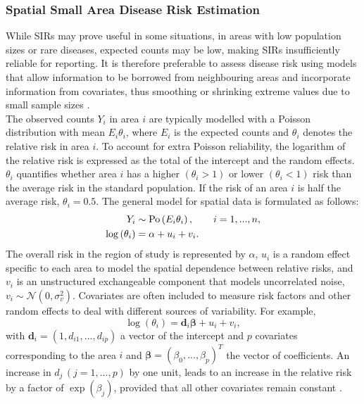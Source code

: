 \subsubsection{Spatial Small Area Disease Risk Estimation}\label{sec:spatial}
While SIRs may prove useful in some situations, in areas with low population sizes or rare diseases, expected counts may be low, making SIRs insufficiently reliable for reporting. It is therefore preferable to assess disease risk using models that allow information to be borrowed from neighbouring areas and incorporate information from covariates, thus smoothing or shrinking extreme values due to small sample sizes \autocite[][]{gelfand2010handbook}. \\
The observed counts $Y_i$ in area $i$ are typically modelled with a Poisson distribution with mean $E_i\theta_i$, where $E_i$ is the expected counts and $\theta_i$ denotes the relative risk in area $i$. To account for extra Poisson reliability, the logarithm of the relative risk is expressed as the total of the intercept and the random effects. $\theta_i$ quantifies whether area $i$ has a higher $\left(\theta_i >1\right)$ or lower $\left(\theta_i <1\right)$ risk than the average risk in the standard population. If the risk of an area $i$ is half the average risk, $\theta_i = 0.5$. The general model for spatial data is formulated as follows:
\begin{align}
    Y_i&\sim\hbox{Po}\left(E_i\theta_i\right), \hspace{20pt} i=1,...,n,\\
    \log\left(\theta_i\right)&=\alpha+u_i+v_i.
\end{align}
The overall risk in the region of study is represented by $\alpha$, $u_i$ is a random effect specific to each area to model the spatial dependence between relative risks, and $v_i$ is an unstructured exchangeable component that models uncorrelated noise, $v_i\sim\mathcal{N}\left(0,\sigma_v^2\right)$. Covariates are often included to measure risk factors and other random effects to deal with different sources of variability. For example,
\begin{equation*}
    \log\left(\theta_i\right)=\pmb{d}_i\pmb{\beta}+u_i+v_i,
\end{equation*}
with $\pmb{d}_i = \left(1,d_{i1},...,d_{ip}\right)$ a vector of the intercept and $p$ covariates corresponding to the area $i$ and $\pmb{\beta}=\left(\beta_0,...,\beta_p\right)^T$ the vector of coefficients. An increase in $d_j\,\left(j = 1,...,p\right)$ by one unit, leads to an increase in the relative risk by a factor of $\exp\left(\beta_j\right)$, provided that all other covariates remain constant \autocite[][]{moraga2019geospatial}.
